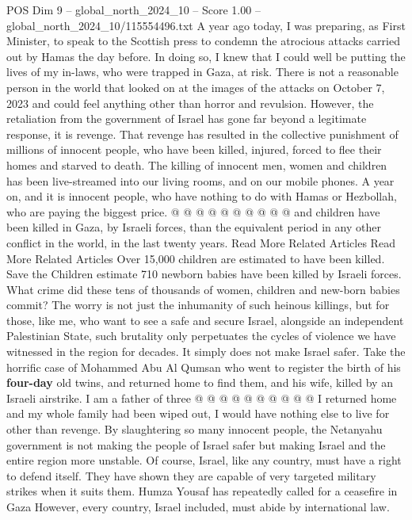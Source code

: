 \begin{textsample}{POS Dim 9 – global\_north\_2024\_10 – Score 1.00 – global\_north\_2024\_10/115554496.txt}  \label{ex:f9_pos_223}
A year ago today, I was preparing, as First Minister, to speak to the Scottish press to condemn the atrocious attacks carried out by Hamas the day before.
In doing so, I knew that I could well be putting the lives of my in-laws, who were trapped in Gaza, at risk.
There is not a reasonable person in the world that looked on at the images of the attacks on October 7, 2023 and could feel anything other than horror and revulsion.
However, the retaliation from the government of Israel has gone far beyond a legitimate response, it is revenge.
That revenge has resulted in the collective punishment of millions of innocent people, who have been killed, injured, forced to flee their homes and starved to death.
The killing of innocent men, women and children has been live-streamed into our living rooms, and on our mobile phones.
A year on, and it is innocent people, who have nothing to do with Hamas or Hezbollah, who are paying the biggest price. @ @ @ @ @ @ @ @ @ @ and children have been killed in Gaza, by Israeli forces, than the equivalent period in any other conflict in the world, in the last twenty years.
Read More Related Articles Read More Related Articles Over 15,000 children are estimated to have been killed.
Save the Children estimate 710 newborn babies have been killed by Israeli forces.
What crime did these tens of thousands of women, children and new-born babies commit?
The worry is not just the inhumanity of such heinous killings, but for those, like me, who want to see a safe and secure Israel, alongside an independent Palestinian State, such brutality only perpetuates the cycles of violence we have witnessed in the region for decades.
It simply does not make Israel safer.
Take the horrific case of Mohammed Abu Al Qumsan who went to register the birth of his \textbf{four-day} old twins, and returned home to find them, and his wife, killed by an Israeli airstrike.
I am a father of three @ @ @ @ @ @ @ @ @ @ I returned home and my whole family had been wiped out, I would have nothing else to live for other than revenge.
By slaughtering so many innocent people, the Netanyahu government is not making the people of Israel safer but making Israel and the entire region more unstable.
Of course, Israel, like any country, must have a right to defend itself.
They have shown they are capable of very targeted military strikes when it suits them.
Humza Yousaf has repeatedly called for a ceasefire in Gaza However, every country, Israel included, must abide by international law.

\end{textsample}
